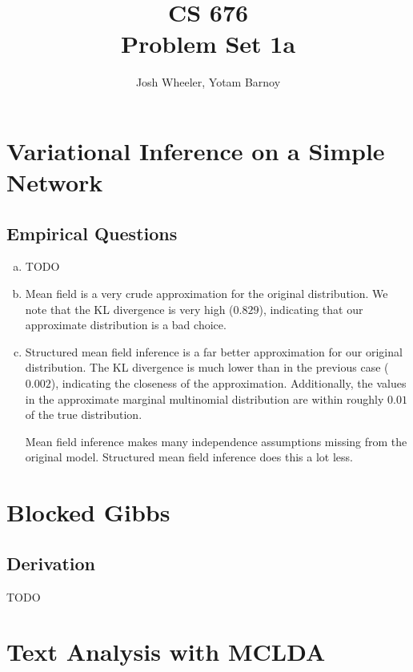 \documentclass[12pt, letterpaper]{article}
\title{CS 676\\ Problem Set 1a}
\author{Josh Wheeler, Yotam Barnoy}
\begin{document}

\maketitle

\setcounter{section}{1}

\section{Variational Inference on a Simple Network}
\subsection{Empirical Questions}
\begin{enumerate}[a.]
\item TODO
\item Mean field is a very crude approximation for the original distribution. We note that the KL divergence is very high ($0.829$), indicating that our approximate distribution is a bad choice.
\item Structured mean field inference is a far better approximation for our original distribution. The KL divergence is much lower than in the previous case ($0.002$), indicating the closeness of the approximation. Additionally, the values in the approximate marginal multinomial distribution are within roughly $0.01$ of the true distribution.

Mean field inference makes many independence assumptions missing from the original model. Structured mean field inference does this a lot less.
\end{enumerate}

\setcounter{section}{4}
\section{Blocked Gibbs}
\subsection{Derivation}
TODO

\section{Text Analysis with MCLDA}
\end{document}
